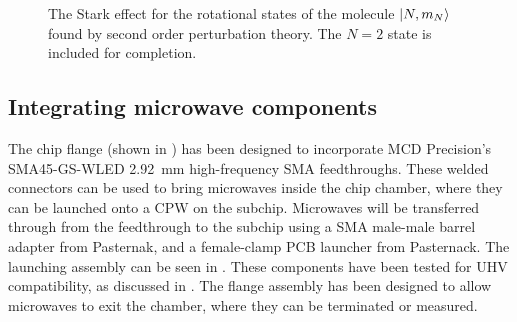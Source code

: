 \begin{figure}[h]
  \centering
  \caption{The Stark effect for the rotational states of the molecule $\ket{N,
    m_N}$ found by second order perturbation theory. The $N=2$ state is
  included for completion.}
  \label{mws:fig:stark}
\end{figure}

\subsection{Integrating microwave components}


The chip flange (shown in ) has been
designed to incorporate MCD Precision's SMA45-GS-WLED \SI{2.92}{\milli\meter}
high-frequency SMA feedthroughs. These welded connectors can be used to bring
microwaves inside the chip chamber, where they can be launched onto a CPW on
the subchip. Microwaves will be transferred through from the feedthrough to the
subchip using a SMA male-male barrel adapter from Pasternak, and a female-clamp
PCB launcher from Pasternack. The launching assembly can be seen in
. These components have been tested for UHV
compatibility, as discussed in .  The flange
assembly has been designed to allow microwaves to exit the chamber, where they
can be terminated or measured.

